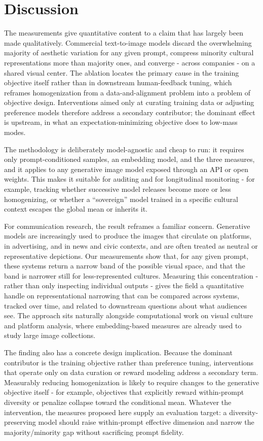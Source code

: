 \documentclass[11pt]{article}
\begin{document}
\section{Discussion}

The measurements give quantitative content to a claim that has largely been made qualitatively. Commercial text-to-image models discard the overwhelming majority of aesthetic variation for any given prompt, compress minority cultural representations more than majority ones, and converge - across companies - on a shared visual center. The ablation locates the primary cause in the training objective itself rather than in downstream human-feedback tuning, which reframes homogenization from a data-and-alignment problem into a problem of objective design. Interventions aimed only at curating training data or adjusting preference models therefore address a secondary contributor; the dominant effect is upstream, in what an expectation-minimizing objective does to low-mass modes.

The methodology is deliberately model-agnostic and cheap to run: it requires only prompt-conditioned samples, an embedding model, and the three measures, and it applies to any generative image model exposed through an API or open weights. This makes it suitable for auditing and for longitudinal monitoring - for example, tracking whether successive model releases become more or less homogenizing, or whether a ``sovereign'' model trained in a specific cultural context escapes the global mean or inherits it.

For communication research, the result reframes a familiar concern. Generative models are increasingly used to produce the images that circulate on platforms, in advertising, and in news and civic contexts, and are often treated as neutral or representative depictions. Our measurements show that, for any given prompt, these systems return a narrow band of the possible visual space, and that the band is narrower still for less-represented cultures. Measuring this concentration - rather than only inspecting individual outputs - gives the field a quantitative handle on representational narrowing that can be compared across systems, tracked over time, and related to downstream questions about what audiences see. The approach sits naturally alongside computational work on visual culture and platform analysis, where embedding-based measures are already used to study large image collections.

The finding also has a concrete design implication. Because the dominant contributor is the training objective rather than preference tuning, interventions that operate only on data curation or reward modeling address a secondary term. Measurably reducing homogenization is likely to require changes to the generative objective itself - for example, objectives that explicitly reward within-prompt diversity or penalize collapse toward the conditional mean. Whatever the intervention, the measures proposed here supply an evaluation target: a diversity-preserving model should raise within-prompt effective dimension and narrow the majority/minority gap without sacrificing prompt fidelity.
\end{document}
